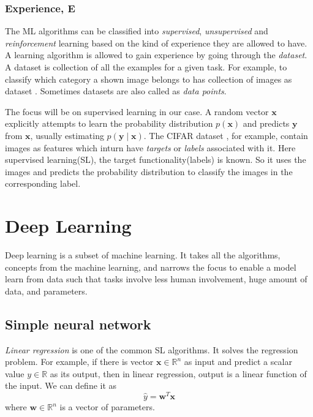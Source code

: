 \subsubsection*{Experience, E}
The ML algorithms can be classified into \textit{supervised}, \textit{unsupervised} and
\textit{reinforcement} learning based on the kind of experience they are allowed to have.
A learning algorithm is allowed to gain experience by going through the \textit{dataset}.
A dataset is collection of all the examples for a given task. For example, to classify
which category a shown image belongs to has collection of images as dataset
\cite{cifar10}. Sometimes datasets are also called as \textit{data points}.

The focus will be on supervised learning in our case.  A random vector $\mathbf{x}$ explicitly attempts to
learn the probability distribution $p(\mathbf{x})$ and predicts $\mathbf{y}$ from
$\mathbf{x}$, usually estimating $p(\mathbf{y}\mid\mathbf{x})$. The CIFAR
dataset \cite{cifar10}, for example, contain images as features which inturn have \textit{targets} or
\textit{labels} associated with it. Here supervised learning(SL), the target
functionality(labels) is known. So it uses the images and predicts the probability
distribution to classify the images in the corresponding label.

\section{Deep Learning}
Deep learning is a subset of machine learning. It takes all the algorithms, concepts from
the machine learning, and narrows the focus to enable a model learn from data such that tasks
involve less human involvement, huge amount of data, and parameters.

\subsection{Simple neural network}
\textit{Linear regression} is one of the common SL algorithms. It solves the regression
problem. For example, if there is vector $\mathbf{x} \in \mathbb{R}^n$ as input and
predict a scalar value $y \in \mathbb{R}$ as its output, then in linear regression, output
is a linear function of the input. We can define it as
\begin{equation}
    \hat y = \mathbf{w}^T\mathbf{x}
    \label{eq:linear equation}
\end{equation}
where $\mathbf{w} \in \mathbb{R}^n$ is a vector of parameters.

